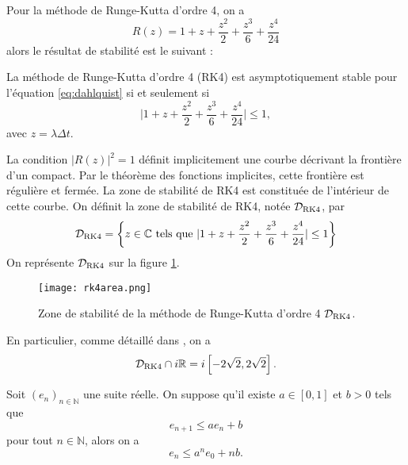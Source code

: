 Pour la méthode de Runge-Kutta d'ordre 4, on a 
\begin{equation}
R(z) = 1 + z + \dfrac{z^2}{2} + \dfrac{z^3}{6} + \dfrac{z^4}{24} 
\label{eq:pol_RK4}
\end{equation}
alors le résultat de stabilité est le suivant :
\begin{proposition}
La méthode de Runge-Kutta d'ordre 4 (RK4) est asymptotiquement stable pour l'équation \eqref{eq:dahlquist} si et seulement si
\begin{equation}
\vert 1 + z + \dfrac{z^2}{2} + \dfrac{z^3}{6} + \dfrac{z^4}{24}  \vert \leq 1,
\end{equation}
avec $z = \lambda \Delta t$.
\label{prop:stab_rk4}
\end{proposition}
La condition $|R(z)|^2 = 1$ définit implicitement une courbe décrivant la frontière d'un compact. Par le théorème des fonctions implicites, cette frontière est régulière et fermée. La zone de stabilité de RK4 est constituée de l'intérieur de cette courbe.
On définit la zone de stabilité de RK4, notée $\mathcal{D}_{\RK4}$, par
\begin{equation}
\mathcal{D}_{\RK4} = \left\lbrace z \in \mathbb{C} \text{ tels que } \vert 1 + z + \dfrac{z^2}{2} + \dfrac{z^3}{6} + \dfrac{z^4}{24}  \vert \leq 1 \right\rbrace
\end{equation} 
On représente $\mathcal{D}_{\RK4}$ sur la figure \ref{fig:stab_area}.
\begin{figure}[htbp]
\begin{center}
\texttt{[image: rk4area.png]}
\end{center}
\caption{Zone de stabilité de la méthode de Runge-Kutta d'ordre 4 $\mathcal{D}_{\RK4}$.}
\label{fig:stab_area}
\end{figure}

En particulier, comme détaillé dans \cite{Hundsdorfer2013}, on a
\begin{equation}
\mathcal{D}_{\RK4} \cap i \mathbb{R} = i \left[-2 \sqrt{2},2 \sqrt{2}\right].
\label{eq:DRK4UiR}
\end{equation}

\begin{lemme}
Soit $(e_n)_{n \in \mathbb{N}}$ une suite réelle. On suppose qu'il existe $a \in [0,1]$ et $b>0$ tels que
\begin{equation}
e_{n+1} \leq a e_n + b 
\end{equation}
pour tout $n \in \mathbb{N}$, alors on a
\begin{equation}
e_n \leq a^n e_0 + nb.
\end{equation}
\label{lem:gronwall_discret}
\end{lemme}

